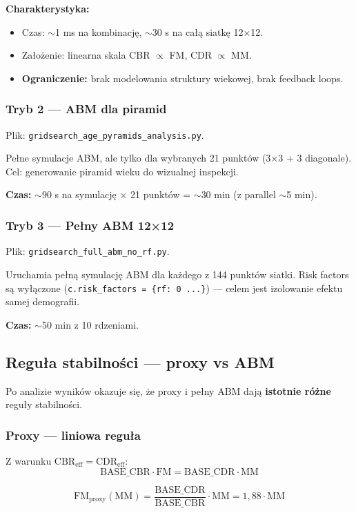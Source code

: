 \documentclass[11pt,a4paper]{article}
\begin{document}
\textbf{Charakterystyka:}
\begin{itemize}
  \item Czas: $\sim$1 ms na kombinację, $\sim$30 s na całą siatkę 12×12.
  \item Założenie: linearna skala CBR $\propto$ FM, CDR $\propto$ MM.
  \item \textbf{Ograniczenie:} brak modelowania struktury wiekowej, brak feedback loops.
\end{itemize}

\subsubsection{Tryb 2 --- ABM dla piramid}

Plik: \texttt{gridsearch\_age\_pyramids\_analysis.py}.

Pełne symulacje ABM, ale tylko dla wybranych 21 punktów (3×3 + 3 diagonale). Cel: generowanie piramid wieku do wizualnej inspekcji.

\textbf{Czas:} $\sim$90 s na symulację × 21 punktów = $\sim$30 min (z parallel $\sim$5 min).

\subsubsection{Tryb 3 --- Pełny ABM 12×12}

Plik: \texttt{gridsearch\_full\_abm\_no\_rf.py}.

Uruchamia pełną symulację ABM dla każdego z 144 punktów siatki. Risk factors są wyłączone (\texttt{c.risk\_factors = \{rf: 0 ...\}}) --- celem jest izolowanie efektu samej demografii.

\textbf{Czas:} $\sim$50 min z 10 rdzeniami.

\subsection{Reguła stabilności --- proxy vs ABM}

Po analizie wyników okazuje się, że proxy i pełny ABM dają \textbf{istotnie różne} reguły stabilności.

\subsubsection{Proxy --- liniowa reguła}

Z warunku $\text{CBR}_{\text{eff}} = \text{CDR}_{\text{eff}}$:
\[
\text{BASE\_CBR} \cdot \mathrm{FM} = \text{BASE\_CDR} \cdot \mathrm{MM}
\]
\begin{formulabox}
\[
\mathrm{FM}_{\text{proxy}}(\mathrm{MM}) = \frac{\text{BASE\_CDR}}{\text{BASE\_CBR}} \cdot \mathrm{MM} = 1{,}88 \cdot \mathrm{MM}
\]
\end{formulabox}
\end{document}
